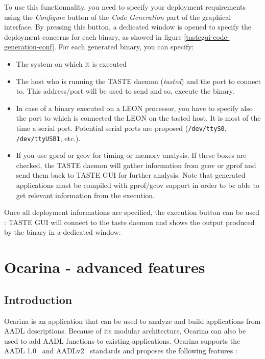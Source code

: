 \documentclass[11pt]{book}
\begin{document}
   To use this functionnality, you need to specify your deployment requirements
   using the \textit{Configure} button of the \textit{Code Generation} part of
   the graphical interface. By pressing this button, a dedicated window is
   opened to specify the deployment concerns for each binary, as showed in
   figure \ref{tastegui-code-generation-conf}.
   For each generated binary, you can specify:
   \begin{itemize}
      \item
         The system on which it is executed
      \item
         The host who is running the TASTE daemon (\textit{tasted}) and the port
         to connect to. This address/port will be used to send and so, execute
         the binary.
      \item
         In case of a binary executed on a LEON processor, you have to specify
         also the port to which is connected the LEON on the tasted host. It is
         most of the time a serial port. Potential serial ports are proposed
         (\texttt{/dev/ttyS0}, \texttt{/dev/ttyUSB1}, etc.).
      \item
         If you use gprof or gcov for timing or memory analysis. If these boxes
         are checked, the TASTE daemon will gather information from gcov or
         gprof and send them back to TASTE GUI for further analysis. Note that
         generated applications must be compiled with gprof/gcov support in
         order to be able to get relevant information from the execution.
   \end{itemize}

   Once all deployment informations are specified, the execution button can be
   used : TASTE GUI will connect to the taste daemon and shows the output
   produced by the binary in a dedicated window.


\chapter{Ocarina - advanced features}

\section{Introduction}

Ocarina is an application that can be used to analyze and build
applications from AADL descriptions. Because of its modular
architecture, Ocarina can also be used to add AADL functions to
existing applications. Ocarina supports the AADL
 1.0~\cite{SAE2004Architecture-An} and
 AADLv2~\cite{SAE2009Architecture-An}
standards and proposes the following features :
\end{document}
